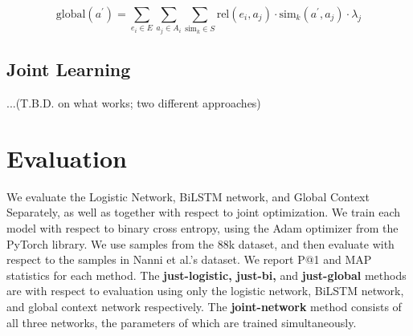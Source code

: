 \documentclass[sigconf,authordraft]{acmart}
\begin{document}
\begin{equation}
\text{global}(a^{'}) = \sum_{e_i  \in E}\sum_{a_j \in A_i}\sum_{\text{sim}_k \in S} \text{rel}(e_i, a_j) \cdot \text{sim}_k(a^{'}, a_j) \cdot \lambda_j
\end{equation}

\subsection{Joint Learning}
...(T.B.D. on what works; two different approaches)


\section{Evaluation}
We evaluate the Logistic Network, BiLSTM network, and Global Context Separately, as well as together with respect to joint optimization. We train each model with respect to binary cross entropy, using the Adam optimizer from the PyTorch library. We use samples from the 88k dataset, and then evaluate with respect to the samples in Nanni et al.'s dataset. We report P@1 and MAP statistics for each method. The \textbf{just-logistic, just-bi,} and \textbf{just-global} methods are with respect to evaluation using only the logistic network, BiLSTM network, and global context network respectively. The \textbf{joint-network} method consists of all three networks, the parameters of which are trained simultaneously.

% 
% 
\end{document}
